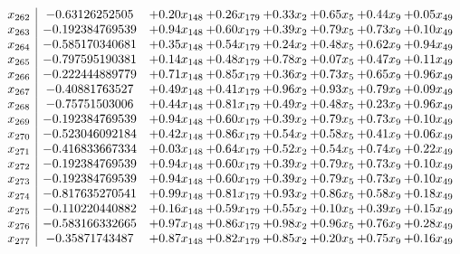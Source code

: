\documentclass[8pt]{article}
\begin{document}
\[\begin{array}{c| c c@{\hskip 2pt} c@{\hskip 2pt} c@{\hskip 2pt} c@{\hskip 2pt} c@{\hskip 2pt} c@{\hskip 2pt} }
 x_{262}   &  -0.63126252505 & +  0.20 x_{148} & +  0.26 x_{179} & +  0.33 x_{2} & +  0.65 x_{5} & +  0.44 x_{9} & +  0.05 x_{49}\\
 x_{263}   &  -0.192384769539 & +  0.94 x_{148} & +  0.60 x_{179} & +  0.39 x_{2} & +  0.79 x_{5} & +  0.73 x_{9} & +  0.10 x_{49}\\
 x_{264}   &  -0.585170340681 & +  0.35 x_{148} & +  0.54 x_{179} & +  0.24 x_{2} & +  0.48 x_{5} & +  0.62 x_{9} & +  0.94 x_{49}\\
 x_{265}   &  -0.797595190381 & +  0.14 x_{148} & +  0.48 x_{179} & +  0.78 x_{2} & +  0.07 x_{5} & +  0.47 x_{9} & +  0.11 x_{49}\\
 x_{266}   &  -0.222444889779 & +  0.71 x_{148} & +  0.85 x_{179} & +  0.36 x_{2} & +  0.73 x_{5} & +  0.65 x_{9} & +  0.96 x_{49}\\
 x_{267}   &  -0.40881763527 & +  0.49 x_{148} & +  0.41 x_{179} & +  0.96 x_{2} & +  0.93 x_{5} & +  0.79 x_{9} & +  0.09 x_{49}\\
 x_{268}   &  -0.75751503006 & +  0.44 x_{148} & +  0.81 x_{179} & +  0.49 x_{2} & +  0.48 x_{5} & +  0.23 x_{9} & +  0.96 x_{49}\\
 x_{269}   &  -0.192384769539 & +  0.94 x_{148} & +  0.60 x_{179} & +  0.39 x_{2} & +  0.79 x_{5} & +  0.73 x_{9} & +  0.10 x_{49}\\
 x_{270}   &  -0.523046092184 & +  0.42 x_{148} & +  0.86 x_{179} & +  0.54 x_{2} & +  0.58 x_{5} & +  0.41 x_{9} & +  0.06 x_{49}\\
 x_{271}   &  -0.416833667334 & +  0.03 x_{148} & +  0.64 x_{179} & +  0.52 x_{2} & +  0.54 x_{5} & +  0.74 x_{9} & +  0.22 x_{49}\\
 x_{272}   &  -0.192384769539 & +  0.94 x_{148} & +  0.60 x_{179} & +  0.39 x_{2} & +  0.79 x_{5} & +  0.73 x_{9} & +  0.10 x_{49}\\
 x_{273}   &  -0.192384769539 & +  0.94 x_{148} & +  0.60 x_{179} & +  0.39 x_{2} & +  0.79 x_{5} & +  0.73 x_{9} & +  0.10 x_{49}\\
 x_{274}   &  -0.817635270541 & +  0.99 x_{148} & +  0.81 x_{179} & +  0.93 x_{2} & +  0.86 x_{5} & +  0.58 x_{9} & +  0.18 x_{49}\\
 x_{275}   &  -0.110220440882 & +  0.16 x_{148} & +  0.59 x_{179} & +  0.55 x_{2} & +  0.10 x_{5} & +  0.39 x_{9} & +  0.15 x_{49}\\
 x_{276}   &  -0.583166332665 & +  0.97 x_{148} & +  0.86 x_{179} & +  0.98 x_{2} & +  0.96 x_{5} & +  0.76 x_{9} & +  0.28 x_{49}\\
 x_{277}   &  -0.35871743487 & +  0.87 x_{148} & +  0.82 x_{179} & +  0.85 x_{2} & +  0.20 x_{5} & +  0.75 x_{9} & +  0.16 x_{49}\\

\end{array}\]
\end{document}

